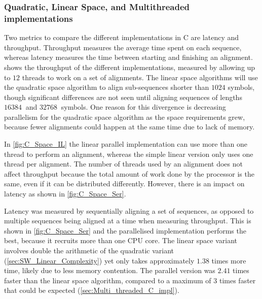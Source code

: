 \subsubsection{Quadratic, Linear Space, and Multithreaded implementations}
\label{sec:C_impls_eval}

Two metrics to compare the different implementations in C are latency and throughput.
Throughput measures the average time spent on each sequence, whereas latency measures the time between starting and finishing an alignment.
 shows the throughput of the different implementations, measured by allowing up to $12$ threads to work on a set of alignments.
The linear space algorithms will use the quadratic space algorithm to align sub-sequences shorter than $1024$ symbols, though significant differences are not seen until aligning sequences of lengths $\SI{16384}{}$ and $\SI{32768}{}$ symbols.
One reason for this divergence is decreasing parallelism for the quadratic space algorithm as the space requirements grew, because fewer alignments could happen at the same time due to lack of memory.

In \cref{fig:C_Space_IL} the linear parallel implementation can use more than one thread to perform an alignment, whereas the simple linear version only uses one thread per alignment.
The number of threads used by an alignment does not affect throughput because the total amount of work done by the processor is the same, even if it can be distributed differently.
However, there is an impact on latency as shown in \cref{fig:C_Space_Ser}.

Latency was measured by sequentially aligning a set of sequences, as opposed to multiple sequences being aligned at a time when measuring throughput.
This is shown in \cref{fig:C_Space_Ser} and the parallelised implementation performs the best, because it recruits more than one CPU core.
The linear space variant involves double the arithmetic of the quadratic variant (\cref{sec:SW_Linear_Complexity}) yet only takes approximately $1.38$ times more time, likely due to less memory contention.
The parallel version was $2.41$ times faster than the linear space algorithm, compared to a maximum of $3$ times faster that could be expected (\cref{sec:Multi_threaded_C_impl}).

